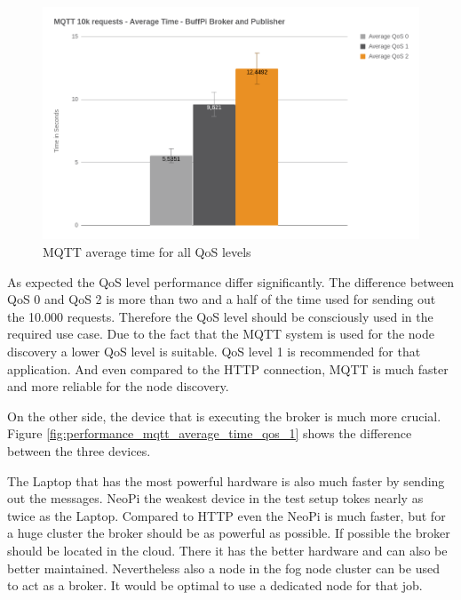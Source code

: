 \begin{figure}[H]
    \centering
    \includegraphics[width=\textwidth]{resources/images/performance_mqtt_average_time.png}
    \caption[MQTT average time for all QoS levels]{MQTT average time for all QoS levels}
    \label{fig:performance_mqtt_average_time_all_qos}
\end{figure}

As expected the \ac{QoS} level performance differ significantly.
The difference between \ac{QoS} 0 and \ac{QoS} 2 is more than two and a half of the time used for sending out the 10.000 requests.
Therefore the \ac{QoS} level should be consciously used in the required use case.
Due to the fact that the MQTT system is used for the node discovery a lower \ac{QoS} level is suitable.
\ac{QoS} level 1 is recommended for that application.
And even compared to the \ac{HTTP} connection, MQTT is much faster and more reliable for the node discovery.\newline

On the other side, the device that is executing the broker is much more crucial.
Figure \ref{fig:performance_mqtt_average_time_qos_1} shows the difference between the three devices.\newline

The Laptop that has the most powerful hardware is also much faster by sending out the messages.
NeoPi the weakest device in the test setup tokes nearly as twice as the Laptop.
Compared to \ac{HTTP} even the NeoPi is much faster, but for a huge cluster the broker should be as powerful as possible.
If possible the broker should be located in the cloud.
There it has the better hardware and can also be better maintained.
Nevertheless also a node in the fog node cluster can be used to act as a broker.
It would be optimal to use a dedicated node for that job.

